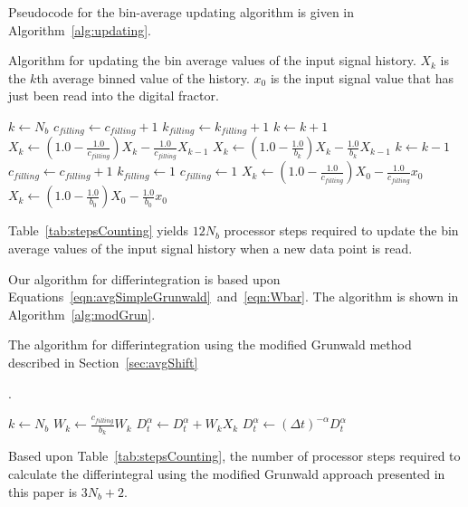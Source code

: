 Pseudocode for the bin-average updating algorithm is given in
Algorithm~\ref{alg:updating}.

\begin{algorithm}
\caption{Algorithm for updating the bin average values of the input signal history. $X_{k}$ is the $k$th average binned value of the history. $x_0$ is the input signal value that has just been read into the digital fractor.}
\label{alg:updating}
\begin{algorithmic}
\STATE $k \gets N_b$
\STATE $c_{filling}\gets c_{filling} +1$
\STATE $k_{filling} \gets k_{filling} +1$
\ENDIF
\STATE $k\gets k+1$
\STATE $X_k \gets \left(1.0-\frac{1.0}{c_{filling}}\right)X_k 
- \frac{1.0}{c_{filling}}X_{k-1}$
\STATE $X_k \gets \left(1.0-\frac{1.0}{b_k}\right)X_k 
- \frac{1.0}{b_k}X_{k-1}$
\ENDIF
\STATE $k\gets k -1$
\ENDWHILE
{}
\STATE $c_{filling} \gets c_{filling} +1$
\STATE $k_{filling} \gets 1$
\STATE $c_{filling} \gets 1$
\ENDIF
\STATE $X_k \gets \left(1.0-\frac{1.0}{c_{filling}}\right)X_0 
- \frac{1.0}{c_{filling}}x_{0}$
\ELSE
\STATE $X_k \gets \left(1.0-\frac{1.0}{b_0}\right)X_0 
- \frac{1.0}{b_0}x_{0}$
\ENDIF
\end{algorithmic}
\end{algorithm}
Table~\ref{tab:stepsCounting} yields $12N_b$ processor steps
required to update the bin average values of the input signal history
when a new data point is read.

\smallskip

Our algorithm for differintegration is based upon
Equations~\ref{eqn:avgSimpleGrunwald}~and~\ref{eqn:Wbar}. The
algorithm is shown in Algorithm~\ref{alg:modGrun}.

\begin{algorithm}
\caption{The algorithm for differintegration using the modified Grunwald method described in Section~\ref{sec:avgShift}}.
\label{alg:modGrun}
\begin{algorithmic}
\STATE $k\gets N_b$
\STATE $W_k\gets\frac{c_{filling}}{b_k}W_k$
\ENDIF
\STATE $D_t^\alpha \gets D_t^\alpha + W_kX_k$
\ENDWHILE
\STATE $D_t^\alpha \gets (\Delta t)^{-\alpha}D_t^\alpha$
\end{algorithmic}
\end{algorithm}
Based upon Table~\ref{tab:stepsCounting}, the number of processor
steps required to calculate the differintegral using the modified
Grunwald approach presented in this paper is $3N_b+2$.

